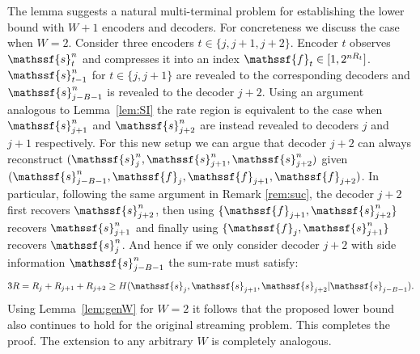\documentclass[journal, twocolumn, 10pt]{IEEEtran}
\newcommand{\rvf}{{\mathssf{f}}}    %
\newcommand{\rvs}{{\mathssf{s}}}    %
\begin{document}
The lemma suggests a natural multi-terminal problem for establishing the lower bound with $W+1$ encoders and decoders. 
For concreteness we discuss the case when $W = 2$. 
Consider three encoders $t \in \{j, j+1, j+2\}$. Encoder $t$ observes  $\rvs_t^n$ and compresses it into an index $\rvf_t \in [1,2^{nR_t}]$.  
$\rvs_{t-1}^n$ for $t \in \{j, j+1\}$ are revealed to the corresponding decoders and $\rvs_{j-B-1}^n$ is revealed to the decoder $j+2$.  
Using an argument analogous to Lemma~\ref{lem:SI} the rate region is equivalent to the case when $\rvs_{j+1}^n$ and $\rvs_{j+2}^n$ are instead revealed to decoders $j$ and $j+1$ respectively. 
For this new setup we can argue that decoder $j+2$ can always reconstruct $(\rvs_j^n, \rvs_{j+1}^n, \rvs_{j+2}^n)$ given $(\rvs_{j-B-1}^n, \rvf_j, \rvf_{j+1},\rvf_{j+2})$. In particular, following the same argument in Remark \ref{rem:suc}, the decoder $j+2$ first recovers $\rvs_{j+2}^n$, then using $\{\rvf_{j+1}, \rvs^n_{j+2}\}$ recovers $\rvs_{j+1}^n$ and finally using $\{\rvf_{j}, \rvs^n_{j+1}\}$ recovers $\rvs_{j}^n$. And hence if we only consider decoder ${j+2}$ with side information $\rvs_{j-B-1}^n$ the sum-rate must satisfy:
\begin{align}
3R = R_j+R_{j+1} + R_{j+2} \ge H(\rvs_j, \rvs_{j+1},\rvs_{j+2}|\rvs_{j-B-1}) \label{eq:lower3}.
\end{align} 
Using 
Lemma~\ref{lem:genW} for $W=2$ it follows that the proposed lower bound also continues to hold for the original streaming problem. This completes the proof. The extension to any arbitrary $W$ is completely analogous.



%
%
%
%
%
%
\end{document}
